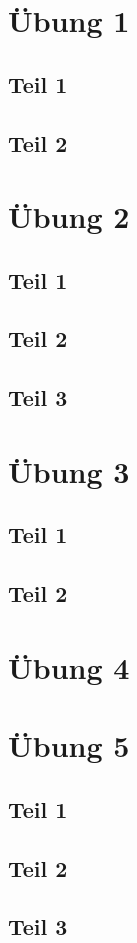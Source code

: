 \documentclass[10pt,a4paper]{article}
\begin{document}
\section*{Übung 1}

\subsection*{Teil 1}

\subsection*{Teil 2}

\section*{Übung 2}

\subsection*{Teil 1}

\subsection*{Teil 2}

\subsection*{Teil 3}

\section*{Übung 3}

\subsection*{Teil 1}

\subsection*{Teil 2}

\section*{Übung 4}

\section*{Übung 5}

\subsection*{Teil 1}

\subsection*{Teil 2}

\subsection*{Teil 3}
\end{document}
